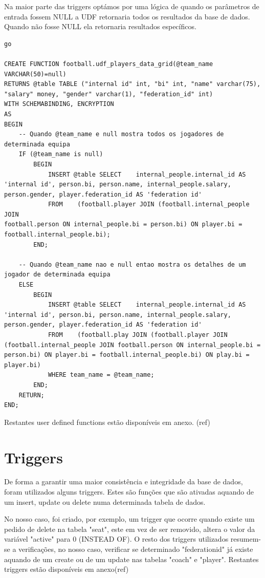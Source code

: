 \documentclass[pdftex,12pt,a4paper]{report}
\begin{document}
Na maior parte das triggers optámos por uma lógica de quando os parâmetros de entrada fossem NULL a UDF retornaria todos os resultados da base de dados. Quando não fosse NULL ela retornaria resultados específicos.


\begin{lstlisting}
go

CREATE FUNCTION football.udf_players_data_grid(@team_name VARCHAR(50)=null)
RETURNS @table TABLE ("internal id" int, "bi" int, "name" varchar(75), "salary" money, "gender" varchar(1), "federation_id" int)
WITH SCHEMABINDING, ENCRYPTION
AS
BEGIN
	-- Quando @team_name e null mostra todos os jogadores de determinada equipa
	IF (@team_name is null)
		BEGIN
			INSERT @table SELECT	internal_people.internal_id AS 'internal id', person.bi, person.name, internal_people.salary, person.gender, player.federation_id AS 'federation id'
			FROM	(football.player JOIN (football.internal_people JOIN
football.person ON internal_people.bi = person.bi) ON player.bi = football.internal_people.bi);
		END;
		
	-- Quando @team_name nao e null entao mostra os detalhes de um jogador de determinada equipa
	ELSE
		BEGIN
			INSERT @table SELECT	internal_people.internal_id AS 'internal id', person.bi, person.name, internal_people.salary, person.gender, player.federation_id AS 'federation id'
			FROM	(football.play JOIN	(football.player JOIN (football.internal_people JOIN football.person ON internal_people.bi = person.bi) ON player.bi = football.internal_people.bi) ON play.bi = player.bi)
			WHERE team_name = @team_name;
		END;
	RETURN;
END;
\end{lstlisting}
 \vspace{0,5in}

Restantes user defined functions estão disponíveis em anexo. (ref)

\newpage
\section{Triggers}
De forma a garantir uma maior consistência e integridade da base de dados, foram utilizados alguns triggers. Estes são funções que são ativadas aquando de um insert, update ou delete numa determinada tabela de dados.

No nosso caso, foi criado, por exemplo, um  trigger que ocorre quando existe um pedido de delete na tabela "seat", este em vez de ser removido, altera o valor da variável "active" para 0 (INSTEAD OF).
O resto dos triggers utilizados resumem-se a verificações, no nosso caso, verificar se determinado "federation{\textunderscore}id" já existe aquando de um create ou de um update nas tabelas "coach" e "player".
Restantes triggers estão disponíveis em anexo(ref)
\\
\end{document}
